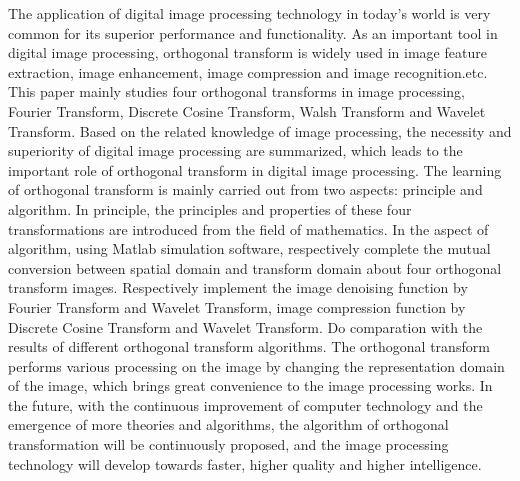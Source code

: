 \begin{enabstract}
	
The application of digital image processing technology in today's world is very common for its superior performance and functionality. As an important tool in digital image processing, orthogonal transform is widely used in image feature extraction, image enhancement, image compression and image recognition.etc.
This paper mainly studies four orthogonal transforms in image processing, Fourier Transform, Discrete Cosine Transform, Walsh Transform and Wavelet Transform. Based on the related knowledge of image processing, the necessity and superiority of digital image processing are summarized, which leads to the important role of orthogonal transform in digital image processing. The learning of orthogonal transform is mainly carried out from two aspects: principle and algorithm. In principle, the principles and properties of these four transformations are introduced from the field of mathematics. In the aspect of algorithm, using Matlab simulation software, respectively complete the mutual conversion between spatial domain and transform domain about four orthogonal transform images. Respectively implement the image denoising function by Fourier Transform and Wavelet Transform, image compression function by Discrete Cosine Transform and Wavelet Transform. Do comparation with the results of different orthogonal transform algorithms.
The orthogonal transform performs various processing on the image by changing the representation domain of the image, which brings great convenience to the image processing works. In the future, with the continuous improvement of computer technology and the emergence of more theories and algorithms, the algorithm of orthogonal transformation will be continuously proposed, and the image processing technology will develop towards faster, higher quality and higher intelligence.
\end{enabstract}
\clearpage
\thispagestyle{toastyle}
\null
\clearpage
